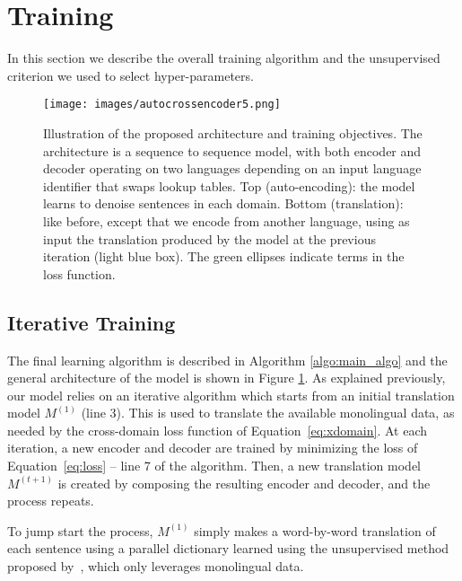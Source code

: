 \section{Training}
In this section we describe the overall training algorithm and the unsupervised criterion we used to select hyper-parameters.

\begin{figure}[!t]
\begin{center}
\texttt{[image: images/autocrossencoder5.png]}
\end{center}
\caption{Illustration of the proposed architecture and training objectives. The architecture is a sequence to sequence model, with both encoder and decoder operating on two languages depending on an input language identifier that swaps lookup tables.
Top (auto-encoding): the model learns to denoise sentences in each domain. Bottom (translation): like before, except that we encode from another language, using as input the translation produced by the model at the previous iteration (light blue box). The green ellipses indicate terms in the loss function.}
\label{fig:model_outline1}
\end{figure}
\subsection{Iterative Training }


The final learning algorithm is described in Algorithm \ref{algo:main_algo} and the general architecture of the model is shown in Figure \ref{fig:model_outline1}. As explained previously, our model relies on an iterative algorithm which starts from an initial translation model $M^{(1)}$ (line 3). This is used to translate the available monolingual data, as needed by the cross-domain loss function of Equation~\ref{eq:xdomain}.
At each iteration, a new encoder and decoder are trained by minimizing the loss of Equation~\ref{eq:loss} -- line 7 of the algorithm. Then, a new translation model $M^{(t+1)}$ is created by composing the resulting encoder and decoder, and the process repeats.

To jump start the process, $M^{(1)}$ simply makes a word-by-word translation of each sentence using a parallel dictionary learned using the unsupervised method proposed by~\citet{wordalign17}, which only leverages monolingual data.

